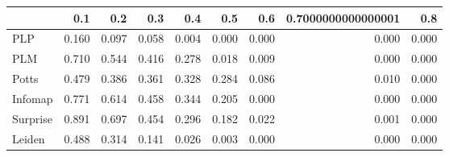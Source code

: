 \begin{tabular}{lrrrrrrrr}
\toprule
{} &   0.1 &   0.2 &   0.3 &   0.4 &   0.5 &   0.6 & 0.7000000000000001 &   0.8 \\
\midrule
PLP      & 0.160 & 0.097 & 0.058 & 0.004 & 0.000 & 0.000 &              0.000 & 0.000 \\
PLM      & 0.710 & 0.544 & 0.416 & 0.278 & 0.018 & 0.009 &              0.000 & 0.000 \\
Potts    & 0.479 & 0.386 & 0.361 & 0.328 & 0.284 & 0.086 &              0.010 & 0.000 \\
Infomap  & 0.771 & 0.614 & 0.458 & 0.344 & 0.205 & 0.000 &              0.000 & 0.000 \\
Surprise & 0.891 & 0.697 & 0.454 & 0.296 & 0.182 & 0.022 &              0.001 & 0.000 \\
Leiden   & 0.488 & 0.314 & 0.141 & 0.026 & 0.003 & 0.000 &              0.000 & 0.000 \\
\bottomrule
\end{tabular}
